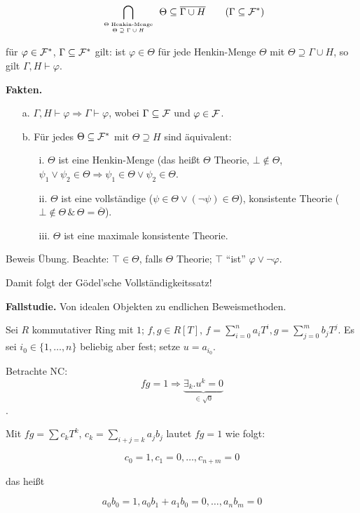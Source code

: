 \documentclass[headsepline=true,DIV=11]{scrartcl}
\theoremstyle{definition}
\renewcommand{\bar}[1]{\overline{#1}}
\begin{document}
$$ \bigcap\limits_{\tiny \begin{array}{c}\Theta\mbox{ Henkin-Menge}\\ \Theta\supseteq\Gamma\cup H\end{array}}\Theta \subseteq \bar{\Gamma\cup H}
\qquad (\Gamma\subseteq{\cal F}^*) $$

für $\varphi\in{\cal F}^*$, $\Gamma\subseteq{\cal F}^*$ gilt: ist $\varphi\in\Theta$ für jede Henkin-Menge $\Theta$ mit $\Theta\supseteq\Gamma\cup H$,
so gilt $\Gamma,H\vdash\varphi$.

{\bf Fakten.}
\begin{itemize}
\item[a.] $\Gamma,H\vdash\varphi\Rightarrow\Gamma\vdash\varphi$, wobei $\Gamma\subseteq{\cal F}$ und $\varphi\in{\cal F}$.
\item[b.] Für jedes $\Theta\subseteq{\cal F}^*$ mit $\Theta\supseteq H$ sind äquivalent:
  \begin{itemize}
  \item[i.] $\Theta$ ist eine Henkin-Menge (das heißt $\Theta$ Theorie, $\bot\not\in\Theta$,
    $\psi_1\vee\psi_2\in\Theta\Rightarrow\psi_1\in\Theta\vee\psi_2\in\Theta$.
  \item[ii.] $\Theta$ ist eine vollständige ($\psi\in\Theta\vee(\lnot\psi)\in\Theta$), konsistente Theorie
    ($\bot\not\in\Theta\,\&\,\Theta=\bar{\Theta}$).
  \item[iii.] $\Theta$ ist eine maximale konsistente Theorie.
  \end{itemize}
\end{itemize}

Beweis Übung. Beachte: $\top\in\Theta$, falls $\Theta$ Theorie; $\top$ ``ist'' $\varphi\vee\lnot\varphi$.

Damit folgt der Gödel'sche Vollständigkeitssatz!

{\bf Fallstudie.} Von idealen Objekten zu endlichen Beweismethoden.

Sei $R$ kommutativer Ring mit $1$; $f,g\in R[T]$, $f=\sum\limits_{i=0}^n a_iT^i, g=\sum\limits_{j=0}^m b_jT^j$. Es sei $i_0\in\{1,\ldots,n\}$ beliebig
aber fest; setze $u=a_{i_0}$.

Betrachte NC: $$fg=1\Rightarrow\underbrace{\exists_k.u^k=0}_{\in\sqrt{0}}$$.

Mit $fg=\sum c_kT^k$, $c_k=\sum\limits_{i+j=k}a_jb_j$ lautet $fg=1$ wie folgt:

$$ c_0=1, c_1=0,\ldots, c_{n+m} = 0  $$

das heißt

$$ a_0 b_0 = 1, a_0 b_1 + a_1 b_0 = 0, \ldots, a_n b_m = 0 $$
\end{document}
